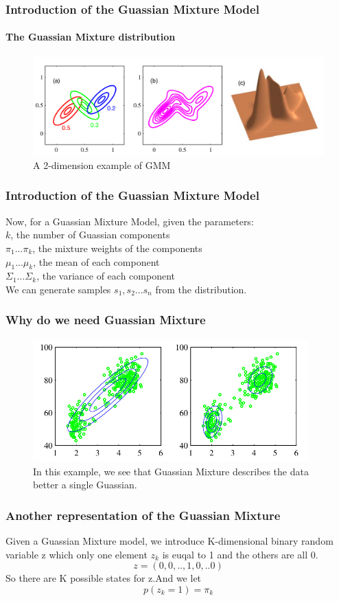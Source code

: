 \documentclass{beamer}
\begin{document}
\begin{frame}
\frametitle{Introduction of the Guassian Mixture Model}
\framesubtitle{The Guassian Mixture distribution}
\begin{figure}
\includegraphics[width=330pt]{GMM-example.png}\\
A 2-dimension example of GMM
\end{figure}
\end{frame}

\begin{frame}
\frametitle{Introduction of the Guassian Mixture Model}
Now, for a Guassian Mixture Model, given the parameters:\\
$k$, the number of Guassian components\\
$\pi_1...\pi_k$, the mixture weights of the components\\
$\mu_1...\mu_k$, the mean of each component\\
$\Sigma_1...\Sigma_k$, the variance of each component\\
We can generate samples $s_1,s_2...s_n$ from the distribution.
\end{frame}

\begin{frame}
\frametitle{Why do we need Guassian Mixture}
\begin{figure}
\includegraphics[width=300pt]{GMMbetterG.png}\\
In this example, we see that Guassian Mixture describes the data better a single Guassian.
\end{figure}
\end{frame}


\begin{frame}
\frametitle{Another representation of the Guassian Mixture}
Given a Guassian Mixture model, we introduce K-dimensional binary random variable z which only one element $z_k$ is euqal to 1 and the others are all 0.\\
\begin{equation}
z=(0,0,..,1,0,..0)
\end{equation}
So there are K possible states for z.And we let
\begin{equation}
p(z_k=1) = \pi_k
\end{equation}

\end{frame}
\end{document}
